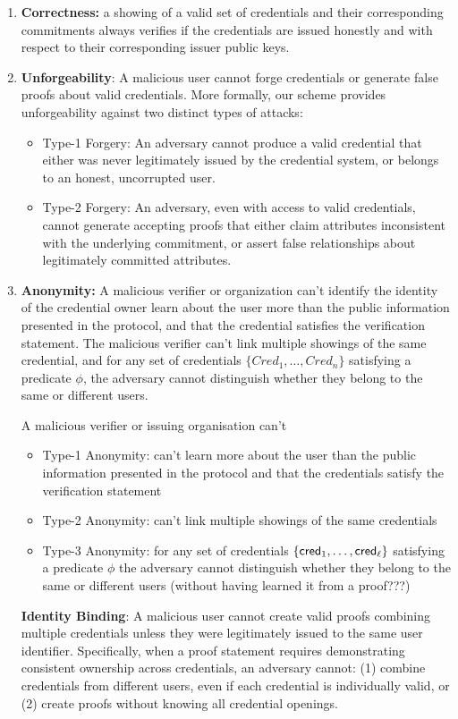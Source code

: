 \begin{enumerate}
    \item \textbf{Correctness: } a showing of a valid set of credentials and their corresponding commitments always verifies if the credentials are issued honestly and with respect to their corresponding issuer public keys. 
    
    \item \textbf{Unforgeability}:
    A malicious user cannot forge credentials or generate false proofs about valid credentials. More formally, our scheme provides unforgeability against two distinct types of attacks:
    \begin{itemize}
        \item Type-1 Forgery: An adversary cannot produce a valid credential that either was never legitimately issued by the credential system, or belongs to an honest, uncorrupted user.
        \item Type-2 Forgery: An adversary, even with access to valid credentials, cannot generate accepting proofs that either claim attributes inconsistent with the underlying commitment, or assert false relationships about legitimately committed attributes.
    \end{itemize}

    \item \textbf{Anonymity:} A malicious verifier or organization can't identify the identity of the credential owner learn about the user more than the public information presented in the protocol, and that the credential satisfies the verification statement. The malicious verifier can't link multiple showings of the same credential, and for any set of credentials $\{Cred_1,\dots,Cred_n\}$ satisfying a predicate $\phi$, the adversary cannot distinguish whether they belong to the same or different users.

    A malicious verifier or issuing organisation can't 
    \begin{itemize}
        \item Type-1 Anonymity: can't learn more about the user than the public information presented in the protocol and that the credentials satisfy the verification statement
        \item Type-2 Anonymity: can't link multiple showings of the same credentials
        \item Type-3 Anonymity: for any set of credentials $\{\mathsf{cred}_1, \ldots, \mathsf{cred}_\ell\}$ satisfying a predicate $\phi$ the adversary cannot distinguish whether they belong to the same or different users (without having learned it from a proof???)
    \end{itemize}

    \textbf{Identity Binding}: A malicious user cannot create valid proofs combining multiple credentials unless they were legitimately issued to the same user identifier. Specifically, when a proof statement requires demonstrating consistent ownership across credentials, an adversary cannot: (1) combine credentials from different users, even if each credential is individually valid, or (2) create proofs without knowing all credential openings.

\end{enumerate}

